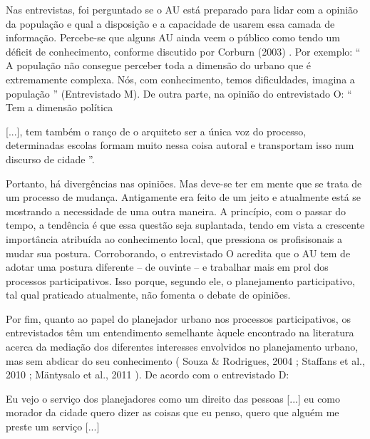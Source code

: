 \documentclass{article}
\begin{document}
Nas entrevistas, foi perguntado se o AU está preparado para lidar com a opinião
					da população e qual a disposição e a capacidade de usarem essa camada de
					informação. Percebe-se que alguns AU ainda veem o público como tendo um déficit
					de conhecimento, conforme discutido por %
Corburn
						(2003)%
. Por exemplo: “%
A população não consegue perceber toda
						a dimensão do urbano que é extremamente complexa. Nós, com conhecimento,
						temos dificuldades, imagina a população%
” (Entrevistado M). De outra
					parte, na opinião do entrevistado O: “%
Tem a dimensão política%

					[...], %
tem também o ranço de o arquiteto ser a única voz do processo,
						determinadas escolas formam muito nessa coisa autoral e transportam isso num
						discurso de cidade%
”.

Portanto, há divergências nas opiniões. Mas deve-se ter em mente que se trata de
					um processo de mudança. Antigamente era feito de um jeito e atualmente está se
					mostrando a necessidade de uma outra maneira. A princípio, com o passar do
					tempo, a tendência é que essa questão seja suplantada, tendo em vista a
					crescente importância atribuída ao conhecimento local, que pressiona os
					profisisonais a mudar sua postura. Corroborando, o entrevistado O acredita que o
					AU tem de adotar uma postura diferente – de ouvinte – e trabalhar mais em prol
					dos processos participativos. Isso porque, segundo ele, o planejamento
					participativo, tal qual praticado atualmente, não fomenta o debate de
					opiniões.

Por fim, quanto ao papel do planejador urbano nos processos participativos, os
					entrevistados têm um entendimento semelhante àquele encontrado na literatura
					acerca da mediação dos diferentes interesses envolvidos no planejamento urbano,
					mas sem abdicar do seu conhecimento (%
Souza
						\& Rodrigues, 2004%
; %
Staffans et
						al., 2010%
; %
Mäntysalo et al.,
						2011%
). De acordo com o entrevistado D: 

Eu vejo o serviço dos planejadores como um direito das pessoas
[...]%
 eu como morador da cidade quero dizer as coisas
						que eu penso, quero que alguém me preste um serviço %
[...]%
\end{document}
